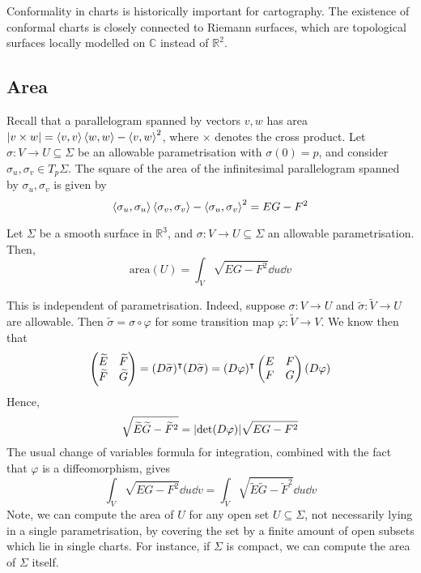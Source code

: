 \begin{remark}
	Conformality in charts is historically important for cartography.
	The existence of conformal charts is closely connected to Riemann surfaces, which are topological surfaces locally modelled on \( \mathbb C \) instead of \( \mathbb R^2 \).
\end{remark}

\subsection{Area}
Recall that a parallelogram spanned by vectors \( v, w \) has area \( \abs{v \times w} = \left\langle{v,v}\right\rangle\left\langle{w,w}\right\rangle - \left\langle{v,w}\right\rangle^2 \), where \( \times \) denotes the cross product.
Let \( \sigma \colon V \to U \subseteq \Sigma \) be an allowable parametrisation with \( \sigma(0) = p \), and consider \( \sigma_u, \sigma_v \in T_p \Sigma \).
The square of the area of the infinitesimal parallelogram spanned by \( \sigma_u, \sigma_v \) is given by
\[
	\left\langle{\sigma_u, \sigma_u}\right\rangle\left\langle{\sigma_v, \sigma_v}\right\rangle - \left\langle{\sigma_u, \sigma_v}\right\rangle^2 = EG - F^2
\]
\begin{definition}
	Let \( \Sigma \) be a smooth surface in \( \mathbb R^3 \), and \( \sigma \colon V \to U \subseteq \Sigma \) an allowable parametrisation.
	Then,
	\[
		\mathrm{area}(U) = \int_V \sqrt{EG - F^2} \dd{u}\dd{v}
	\]
\end{definition}
\begin{remark}
	This is independent of parametrisation.
	Indeed, suppose \( \sigma \colon V \to U \) and \( \widetilde \sigma \colon \widetilde V \to U \) are allowable.
	Then \( \widetilde \sigma = \sigma \circ \varphi \) for some transition map \( \varphi \colon \widetilde V \to V \).
	We know then that
	\[
		\begin{pmatrix}
			\widetilde E & \widetilde F \\
			\widetilde F & \widetilde G
		\end{pmatrix} = (D\widetilde \sigma)^\intercal (D\widetilde \sigma) = (D\varphi)^\intercal \begin{pmatrix}
			E & F \\
			F & G
		\end{pmatrix} (D\varphi)
	\]
	Hence,
	\[
		\sqrt{\widetilde E \widetilde G - \widetilde F^2} = \abs{\det(D\varphi)} \sqrt{EG - F^2}
	\]
	The usual change of variables formula for integration, combined with the fact that \( \varphi \) is a diffeomorphism, gives
	\[
		\int_V \sqrt{EG - F^2} \dd{u}\dd{v} = \int_{\widetilde V} \sqrt{\widetilde E \widetilde G - \widetilde F^2} \dd{u}\dd{v}
	\]
	Note, we can compute the area of \( U \) for any open set \( U \subseteq \Sigma \), not necessarily lying in a single parametrisation, by covering the set by a finite amount of open subsets which lie in single charts.
	For instance, if \( \Sigma \) is compact, we can compute the area of \( \Sigma \) itself.
\end{remark}
